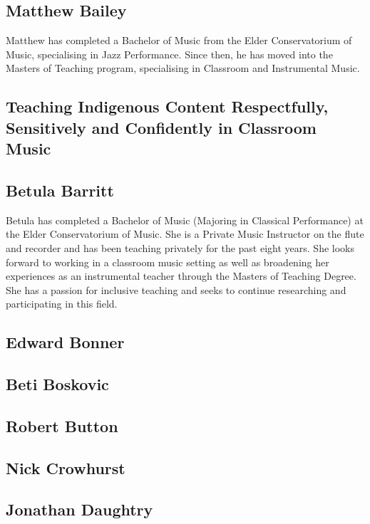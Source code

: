 \documentclass[twoside,14pt,a4paper,notitlepage]{memoir}
\begin{document}
\subsection*{Matthew Bailey}

Matthew has completed a Bachelor of Music from the Elder Conservatorium of Music, specialising in Jazz Performance. Since then, he has moved into the Masters of Teaching program, specialising in Classroom and Instrumental Music.


\subsection*{Teaching Indigenous Content Respectfully, Sensitively and Confidently in Classroom Music}

\subsection*{Betula Barritt}

Betula has completed a Bachelor of Music (Majoring in Classical Performance) at the Elder Conservatorium of Music. She is a Private Music Instructor on the flute and recorder and has been teaching privately for the past eight years. She looks forward to working in a classroom music setting as well as broadening her experiences as an instrumental teacher through the Masters of Teaching Degree. She has a passion for inclusive teaching and seeks to continue researching and participating in this field.


\subsection*{Edward Bonner}


\subsection*{Beti Boskovic}


\subsection*{Robert Button}


\subsection*{Nick Crowhurst}


\subsection*{Jonathan Daughtry}
\end{document}
